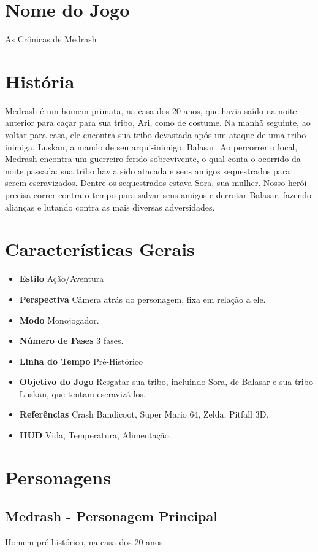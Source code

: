 \documentclass[letterpaper,11pt]{article}
\begin{document}
\section{Nome do Jogo}
As Crônicas de Medrash

\section{História}
Medrash é um homem primata, na casa dos 20 anos, que havia saído na noite anterior para caçar para sua tribo, Ari, como de costume.
Na manhã seguinte, ao voltar para casa, ele encontra sua tribo devastada após um ataque de uma tribo inimiga, Luskan, a mando de seu arqui-inimigo, Balasar. 
Ao percorrer o local, Medrash encontra um guerreiro ferido sobrevivente, o qual conta o ocorrido da noite passada: sua tribo havia sido atacada e seus amigos sequestrados para serem escravizados. Dentre os sequestrados estava Sora, sua mulher. Nosso herói precisa correr contra o tempo para salvar seus amigos e derrotar Balasar, fazendo alianças e lutando contra as mais diversas adversidades.

\section{Características Gerais}
\begin{itemize}
\item {\bf Estilo} Ação/Aventura
\item {\bf Perspectiva} Câmera atrás do personagem, fixa em relação a ele.
\item {\bf Modo} Monojogador.
\item {\bf Número de Fases} 3 fases.
\item {\bf Linha do Tempo} Pré-Histórico
\item {\bf Objetivo do Jogo} Resgatar sua tribo, incluindo Sora, de Balasar e sua tribo Luskan, que tentam escravizá-los.
\item {\bf Referências} Crash Bandicoot, Super Mario 64, Zelda, Pitfall 3D.
\item {\bf HUD} Vida, Temperatura, Alimentação.
\end{itemize}

\section{Personagens}

\subsection{Medrash - Personagem Principal}
Homem pré-histórico, na casa dos 20 anos.
\end{document}

